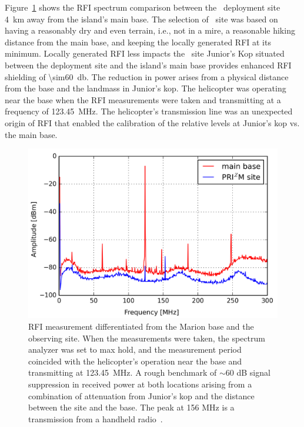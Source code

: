 Figure~\ref{fig:rfi} shows the RFI spectrum comparison between the \prizm\ deployment site \SI{4}{\kilo\metre} away from the island's main base. The selection of \prizm\ site was based on having a reasonably dry and even terrain, i.e., not in a mire, a reasonable hiking distance from the main base, and keeping the locally generated RFI at its minimum. Locally generated RFI less impacts the \prizm\ site Junior's Kop situated between the deployment site and the island's main base provides enhanced RFI shielding of \SI{\sim60}{\decibel}. The reduction in power arises from a physical distance from the base and the landmass in Junior's kop. The helicopter was operating near the base when the RFI measurements were taken and transmitting at a frequency of \SI{123.45}{\mega\hertz}. The helicopter's transmission line was an unexpected origin of RFI that enabled the calibration of the relative levels at Junior's kop vs. the main base.

\begin{figure}
	\centering
	\includegraphics[width=\linewidth]{Figures/rfi}
	\caption{RFI measurement differentiated from the Marion base and the \prizm observing site. When the measurements were taken, the spectrum analyzer was set to max hold, and the measurement period coincided with the helicopter's operation near the base and transmitting at \SI{123.45}{\mega\hertz}. A rough benchmark of $\sim$60 dB signal suppression in received power at both locations arising from a combination of attenuation from Junior's kop and the distance between the \prizm site and the base. The peak at 156 MHz is a transmission from a handheld radio~\citep{2019JAI.....850004P}.}
	\label{fig:rfi}
\end{figure}

